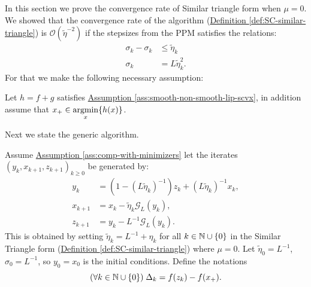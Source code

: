 \documentclass[12pt]{article}
\begin{document}
    In this section we prove the convergence rate of Similar triangle form when $\mu = 0$. 
    We showed that the convergence rate of the algorithm 
    (\hyperref[def:SC-similar-triangle]{Definition \ref*{def:SC-similar-triangle}})
    is $\mathcal O(\tilde \eta ^{-2})$ if the stepsizes from the PPM satisfies the relations: 
    \begin{align*}
        \sigma_{k} - \sigma_{k} &\le \tilde\eta_k
        \\
        \sigma_k &= L \tilde \eta_k^2. 
    \end{align*}
    For that we make the following necessary assumption: 
    \begin{assumption}\label{ass:comp-with-minimizers}
        Let $h = f + g$ satisfies 
        \hyperref[ass:smooth-non-smooth-lip-scvx]
        {Assumption \ref*{ass:smooth-non-smooth-lip-scvx}}, 
        in addition assume that $x_+ \in \mathop{\rm argmin}\limits_x \{h(x)\}$. 
    \end{assumption}
    Next we state the generic algorithm. 
    \begin{definition}
        \label{def:similar-triangle-to-prove}
        Assume
        \hyperref[ass:comp-with-minimizers]
        {Assumption \ref*{ass:comp-with-minimizers}}
        let the iterates $(y_k, x_{k + 1}, z_{k +1})_{k \ge 0}$ be generated by: 
        \begin{align}
            y_k &= (1 - (L\tilde \eta_k)^{-1}) z_k + (L\tilde \eta_k)^{-1} x_k, 
            \\
            x_{k + 1} &= x_k - \tilde \eta_k \mathcal G_L(y_k), 
            \\
            z_{k + 1} &= y_k - L^{-1} \mathcal G_L(y_k). 
            \label{eqn:similar-triangle-to-prove}
        \end{align}
        This is obtained by setting $\tilde \eta_k = L^{-1} + \eta_k$ for all $k \in \mathbb N\cup \{0\}$ in the Similar Triangle form 
        (\hyperref[def:SC-similar-triangle]
            {Definition \ref*{def:SC-similar-triangle}}) 
        where $\mu =0$. 
        Let $\tilde \eta_0 = L^{-1}$, $\sigma_0 = L^{-1}$, so $y_0 = x_0$ is the initial conditions. 
        Define the notations 
        $$
            (\forall k \in \mathbb N \cup \{0\})\; \Delta_k = f(z_k) - f(x_+). 
        $$
    \end{definition}
    
\end{document}

